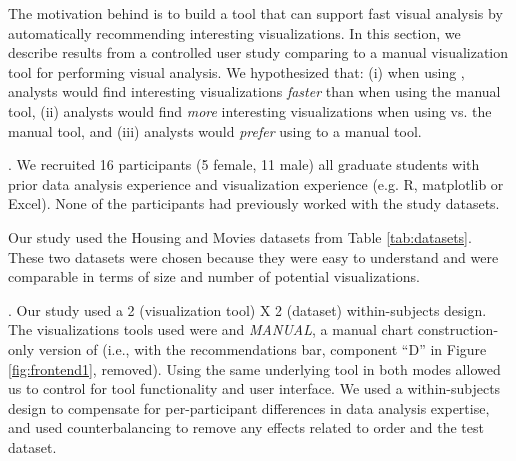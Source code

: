 The motivation behind \SeeDB is to build a tool that can support fast
visual analysis by automatically recommending interesting visualizations.
In this section, we describe results from a controlled user study comparing 
\SeeDB to a manual visualization tool for performing visual analysis. 
We hypothesized that: (i) when using \SeeDB, analysts would find interesting 
visualizations {\em faster} than when using the manual tool, (ii) analysts
would find {\it more} interesting visualizations when using \SeeDB vs. the 
manual tool, and (iii) analysts would {\em prefer} using \SeeDB to a manual tool.


. We recruited 16 participants (5 female, 11
 male) all graduate students with prior data analysis experience and visualization
 experience (e.g. R, matplotlib or Excel).
 None of the participants had previously worked with the study datasets.

 Our study used the Housing and Movies datasets from 
 Table \ref{tab:datasets}.
 These two datasets were chosen because they were easy to understand and 
 were comparable in terms of size and number of potential visualizations.
 
.
Our study used a 2 (visualization tool) X 2 (dataset) within-subjects design.
The visualizations tools used were \SeeDB and {\em MANUAL}, a manual chart
construction-only version of \SeeDB (i.e., \SeeDB with the recommendations bar, 
component ``D'' in Figure \ref{fig:frontend1}, removed).
Using the same underlying tool in both modes allowed us to control for
tool functionality and user interface.
We used a within-subjects design to compensate for per-participant differences 
in data analysis expertise, and used counterbalancing to remove any effects 
related to order and the test dataset.

